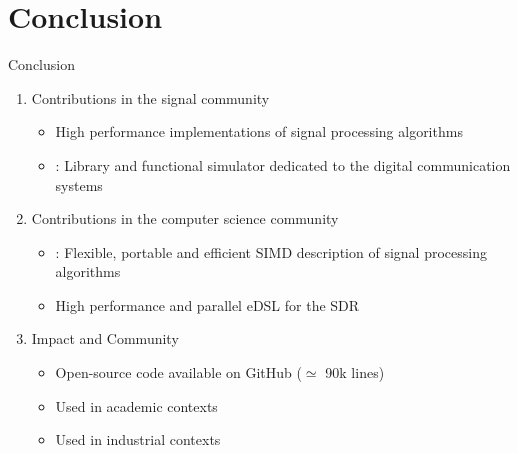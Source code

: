 
\section[Conclusion]{Conclusion}


\begin{frame}{Conclusion}
  \vfill
  \begin{enumerate}
    \item Contributions in the signal community
    \begin{itemize}
      \item High performance implementations of signal processing algorithms%
      \item \AFFECT: Library and functional simulator dedicated to the digital communication systems%
    \end{itemize}
    \vspace{0.3cm}
    \pause
    \item Contributions in the computer science community
    \begin{itemize}
      \item \MIPP: Flexible, portable and efficient SIMD description of signal processing algorithms%
      \item High performance and parallel eDSL for the SDR
    \end{itemize}
    \vspace{0.3cm}
    \pause
    \item Impact and Community
    \begin{itemize}
      \item Open-source code available on GitHub ($\simeq $ 90k lines)
      \item Used in academic contexts
      \item Used in industrial contexts
    \end{itemize}
  \end{enumerate}
  \vfill
\end{frame}


